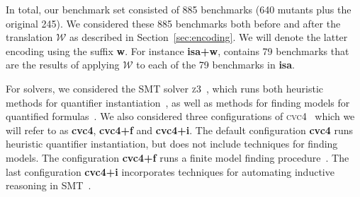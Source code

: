 \documentclass[runningheads,a4paper]{llncs}
\newcommand{\cvc}{\textsc{cvc}{\small 4}\xspace}
\newcommand{\ziii}{\textsc{z}{\small 3}\xspace}
\newcommand{\conv}{\mathcal{W}}
\begin{document}
In total, our benchmark set consisted of 885 benchmarks (640 mutants plus the original 245).
We considered these 885 benchmarks both before and after the translation $\conv$ as described in Section~\ref{sec:encoding}.
We will denote the latter encoding using the suffix {\bf w}.
For instance {\bf isa+w}, contains 79 benchmarks that are the results of applying $\conv$ to each of the 79 benchmarks in {\bf isa}.

For solvers, we considered the SMT solver \ziii~\cite{de-moura-bjoerner-2008}, 
which runs both heuristic methods for quantifier instantiation~\cite{DBLP:conf/cade/MouraB07},
as well as methods for finding models for quantified formulas~\cite{GeDeM-CAV-09}.
We also considered three configurations of \cvc~\cite{barrett-et-al-2011} which we will refer to as {\bf cvc4}, {\bf cvc4+f} and {\bf cvc4+i}.
The default configuration {\bf cvc4} runs heuristic quantifier instantiation, 
but does not include techniques for finding models.
The configuration {\bf cvc4+f} runs a finite model finding procedure~\cite{ReyEtAl-1-RR-13, reynolds-et-al-2013}.
The last configuration {\bf cvc4+i} incorporates techniques for automating inductive reasoning in SMT~\cite{reynolds-kuncak-2015}.
\end{document}

